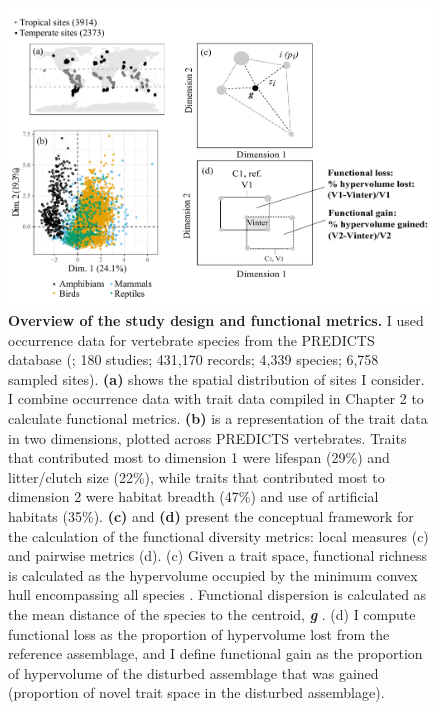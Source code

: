\begin{figure}[h!]
\centering
\includegraphics[scale=0.65]{figures/Chapter_FD/Figure1}
\caption[Overview of the study design and functional metrics.]{\textbf{Overview of the study design and functional metrics.} I used occurrence data for vertebrate species from the PREDICTS database (\citep{Hudson2014, Hudson2017}; 180 studies; 431,170 records; 4,339 species; 6,758 sampled sites). \textbf{(a)} shows the spatial distribution of sites I consider. I combine occurrence data with trait data compiled in Chapter 2 to calculate functional metrics. \textbf{(b)} is a representation of the trait data in two dimensions, plotted across PREDICTS vertebrates. Traits that contributed most to dimension 1 were lifespan (29\%) and litter/clutch size (22\%), while traits that contributed most to dimension 2 were habitat breadth (47\%) and use of artificial habitats (35\%). \textbf{(c)} and \textbf{(d)} present the conceptual framework for the calculation of the functional diversity metrics: local measures (c) and pairwise metrics (d). (c) Given a trait space, functional richness is calculated as the hypervolume occupied by the minimum convex hull encompassing all species \cite{Villeger2008}. Functional dispersion is calculated as the mean distance of the species to the centroid, \textbf{\textit{g}} \cite{Laliberte2010}. (d) I compute functional loss as the proportion of hypervolume lost from the reference assemblage, and I define functional gain as the proportion of hypervolume of the disturbed assemblage that was gained (proportion of novel trait space in the disturbed assemblage).}
\label{chap3_fig1}
\end{figure}



